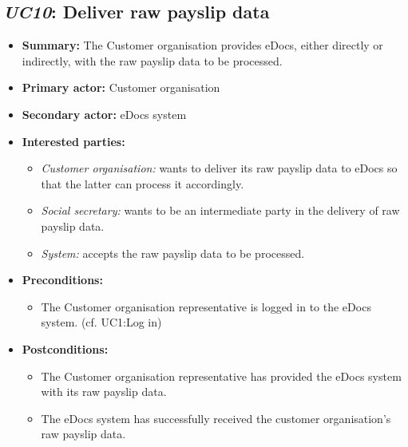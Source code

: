 \documentclass[a4paper,10pt]{article}
\begin{document}
\subsection{\emph{UC10}: Deliver raw payslip data}
\label{usecase:deliverrawpayslipdata}
\begin{itemize}
    \item \textbf{Summary:} The Customer organisation provides eDocs, either directly or indirectly, with the raw payslip data to be processed.
    \item \textbf{Primary actor:} Customer organisation
    \item \textbf{Secondary actor:} eDocs system
    \item \textbf{Interested parties:} 
        \begin{itemize}
            \item \textit{Customer organisation:} wants to deliver its raw payslip data to eDocs so that the latter can process it accordingly.
            \item \textit{Social secretary:} wants to be an intermediate party in the delivery of raw payslip data.
            \item \textit{System:} accepts the raw payslip data to be processed.
        \end{itemize}
    \item \textbf{Preconditions:}
        \begin{itemize}
            \item The Customer organisation representative is logged in to the eDocs system. (cf. UC1:Log in)
        \end{itemize}
    \item \textbf{Postconditions:}
        \begin{itemize}
            \item The Customer organisation representative has provided the eDocs system with its raw payslip data.
            \item The eDocs system has successfully received the customer organisation's raw payslip data.
        \end{itemize}
        

\end{itemize}
\end{document}

